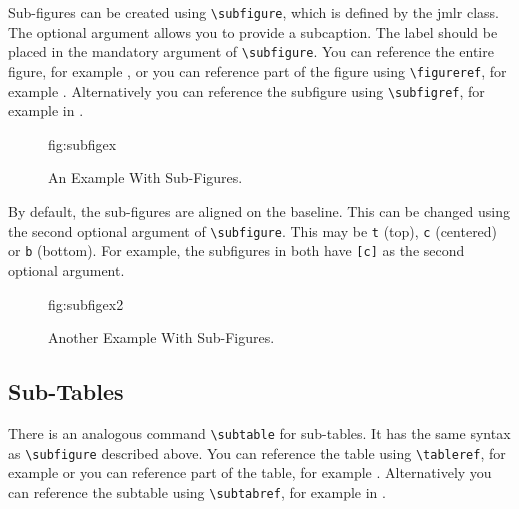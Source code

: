 \documentclass[tablecaption=bottom,wcp]{jmlr} %
\begin{document}
Sub-figures can be created using \verb|\subfigure|, which is
defined by the \textsf{jmlr} class. The optional argument allows
you to provide a subcaption. The label should be placed in the
mandatory argument of \verb|\subfigure|. You can reference the
entire figure, for example , or you can
reference part of the figure using \verb|\figureref|, for example
. Alternatively you can reference the
subfigure using \verb|\subfigref|, for example
 in .

\begin{figure}[htbp]
  \floatconts
  {fig:subfigex}
  {\caption{An Example With Sub-Figures.}}
  {%
    \qquad
  }
\end{figure}

By default, the sub-figures are aligned on the baseline.
This can be changed using the second optional argument
of \verb|\subfigure|. This may be \texttt{t} (top), \texttt{c}
(centered) or \texttt{b} (bottom). For example, the subfigures
 in 
both have \verb|[c]| as the second optional argument.

\begin{figure}[htbp]
  \floatconts
  {fig:subfigex2}
  {\caption{Another Example With Sub-Figures.}}
  {%
    \qquad
  }
\end{figure}

\subsection{Sub-Tables}
\label{sec:subtables}
There is an analogous command \verb|\subtable| for sub-tables.
It has the same syntax as \verb|\subfigure| described above.
You can reference the table using \verb|\tableref|, for example
 or you can reference part of the table,
for example . Alternatively you can reference the
subtable using \verb|\subtabref|, for example
 in .
\end{document}
